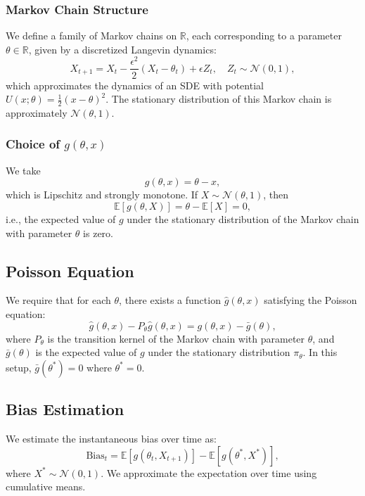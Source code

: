 \documentclass[a4paper]{article}
\begin{document}
	 \subsubsection*{Markov Chain Structure}
	 
	 We define a family of Markov chains on \(\mathbb{R}\), each corresponding to a parameter \(\theta \in \mathbb{R}\), given by a discretized Langevin dynamics:
	 \[
	 X_{t+1} = X_t - \frac{\epsilon^2}{2} (X_t - \theta_t) + \epsilon Z_t, \quad Z_t \sim \mathcal{N}(0, 1),
	 \]
	 which approximates the dynamics of an SDE with potential \(U(x; \theta) = \frac{1}{2}(x - \theta)^2\). The stationary distribution of this Markov chain is approximately \(\mathcal{N}(\theta, 1)\).
	 
	 \subsubsection*{Choice of \(g(\theta, x)\)}
	 
	 We take
	 \[
	 g(\theta, x) = \theta - x,
	 \]
	 which is Lipschitz and strongly monotone. If \(X \sim \mathcal{N}(\theta, 1)\), then
	 \[
	 \mathbb{E}[g(\theta, X)] = \theta - \mathbb{E}[X] = 0,
	 \]
	 i.e., the expected value of \(g\) under the stationary distribution of the Markov chain with parameter \(\theta\) is zero.
	 
	 \subsection*{Poisson Equation}
	 
	 We require that for each \(\theta\), there exists a function \(\hat{g}(\theta, x)\) satisfying the Poisson equation:
	 \[
	 \hat{g}(\theta, x) - P_\theta \hat{g}(\theta, x) = g(\theta, x) - \bar{g}(\theta),
	 \]
	 where \(P_\theta\) is the transition kernel of the Markov chain with parameter \(\theta\), and \(\bar{g}(\theta)\) is the expected value of \(g\) under the stationary distribution \(\pi_\theta\). In this setup, \(\bar{g}(\theta^*) = 0\) where \(\theta^* = 0\).
	 
	 \subsection*{Bias Estimation}
	 
	 We estimate the instantaneous bias over time as:
	 \[
	 \text{Bias}_t = \mathbb{E}[g(\theta_t, X_{t+1})] - \mathbb{E}[g(\theta^*, X^*)],
	 \]
	 where \(X^* \sim \mathcal{N}(0, 1)\). We approximate the expectation over time using cumulative means.
	 
\end{document}
